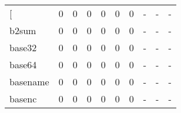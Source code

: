 \begin{longtable}{lp{2.0cm}p{2.0cm}p{2.0cm}p{2.0cm}p{2.0cm}p{2.0cm}p{2.0cm}p{2.0cm}p{2.0cm}}
\bottomrule
\endlastfoot
{[}         &                      0 &                                             0 &                                            0 &                                           0 &                                            0 &                                          0 &                                    - &                                      - &                                    - \\
b2sum     &                      0 &                                             0 &                                            0 &                                           0 &                                            0 &                                          0 &                                    - &                                      - &                                    - \\
base32    &                      0 &                                             0 &                                            0 &                                           0 &                                            0 &                                          0 &                                    - &                                      - &                                    - \\
base64    &                      0 &                                             0 &                                            0 &                                           0 &                                            0 &                                          0 &                                    - &                                      - &                                    - \\
basename  &                      0 &                                             0 &                                            0 &                                           0 &                                            0 &                                          0 &                                    - &                                      - &                                    - \\
basenc    &                      0 &                                             0 &                                            0 &                                           0 &                                            0 &                                          0 &                                    - &                                      - &                                    - \\

\end{longtable}

